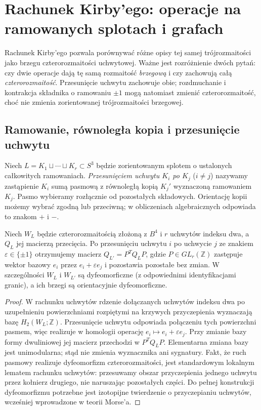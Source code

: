 \chapter{Rachunek Kirby'ego: operacje na ramowanych splotach i grafach}
\label{ch:tg-kirby-full}

Rachunek Kirby'ego pozwala porównywać różne opisy
tej samej trójrozmaitości jako brzegu czterorozmaitości
uchwytowej. Ważne jest rozróżnienie dwóch pytań:
czy dwie operacje dają tę samą rozmaitość \emph{brzegową}
i czy zachowują całą \emph{czterorozmaitość}.
Przesunięcie uchwytu zachowuje obie;
rozdmuchanie i kontrakcja składnika o ramowaniu $\pm1$
mogą natomiast zmienić czterorozmaitość,
choć nie zmienia zorientowanej trójrozmaitości brzegowej.

\section{Ramowanie, równoległa kopia i przesunięcie uchwytu}
\label{sec:tg-kirby-slides}

\begin{definicja}
Niech $L=K_1\sqcup\cdots\sqcup K_r\subset S^3$
będzie zorientowanym splotem o ustalonych całkowitych
ramowaniach. \emph{Przesunięciem uchwytu $K_i$ po $K_j$}
($i\ne j$) nazywamy zastąpienie $K_i$ sumą pasmową
z równoległą kopią $K_j'$ wyznaczoną ramowaniem $K_j$.
Pasmo wybieramy rozłącznie od pozostałych składowych.
Orientację kopii możemy wybrać zgodną lub przeciwną;
w obliczeniach algebraicznych odpowiada to znakom $+$ i $-$.
\end{definicja}

\begin{stwierdzenie}
\label{prop:tg-kirby-congruence}
Niech $W_L$ będzie czterorozmaitością złożoną z $B^4$
i $r$ uchwytów indeksu dwa, a $Q_L$ jej macierzą przecięcia.
Po przesunięciu uchwytu $i$ po uchwycie $j$ ze znakiem
$\varepsilon\in\{\pm1\}$ otrzymujemy macierz
$Q_{L'}=P^TQ_LP$, gdzie $P\in GL_r(\mathbb Z)$
zastępuje wektor bazowy $e_i$ przez
$e_i+\varepsilon e_j$ i pozostawia pozostałe bez zmian.
W szczególności $W_L$ i $W_{L'}$ są dyfeomorficzne
(z odpowiednimi identyfikacjami granic), a ich brzegi
są orientacyjnie dyfeomorficzne.
\end{stwierdzenie}

\begin{proof}
W rachunku uchwytów rdzenie dołączanych uchwytów indeksu dwa
po uzupełnieniu powierzchniami rozpiętymi na krzywych
przyczepienia wyznaczają bazę $H_2(W_L;\mathbb Z)$.
Przesunięcie uchwytu odpowiada połączeniu tych powierzchni
pasmem, więc realizuje w homologii operację
$e_i\mapsto e_i+\varepsilon e_j$.
Przy zmianie bazy formy dwuliniowej jej macierz
przechodzi w $P^TQ_LP$. Elementarna zmiana bazy
jest unimodularna; stąd nie zmienia wyznacznika ani
sygnatury. Fakt, że ruch pasmowy realizuje dyfeomorfizm
czterorozmaitości, jest standardowym lokalnym lematem
rachunku uchwytów: przesuwamy obszar przyczepienia
jednego uchwytu przez kołnierz drugiego, nie naruszając
pozostałych części. Do pełnej konstrukcji dyfeomorfizmu
potrzebne jest izotopijne twierdzenie o przyczepianiu
uchwytów, wcześniej wprowadzone w teorii Morse'a.
\end{proof}

